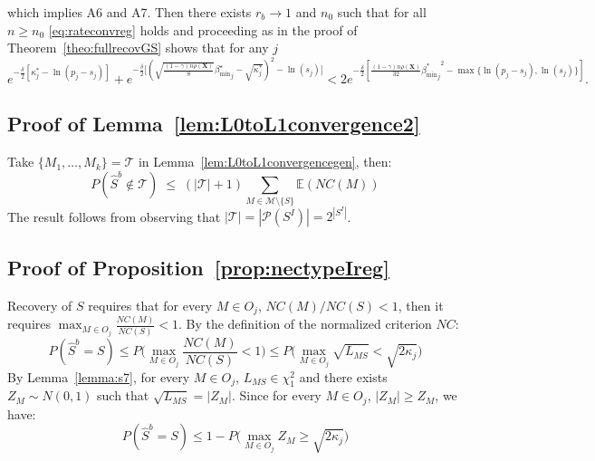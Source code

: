 \documentclass[aos]{imsart}
\theoremstyle{plain}
\newcommand{\E}{\mathbb{E}}
\newcommand{\bs}{\boldsymbol}
\begin{document}
\begin{supplement}
    which implies A6 and A7. Then there exists $r_b\to 1$ and $n_0$ such that for all $n\geq n_0$ \eqref{eq:rateconvreg} holds and proceeding as in the proof of Theorem~\ref{theo:fullrecovGS} shows that for any $j$ 
    $$e^{-\frac{\delta}{2}\left[{\kappa^*_j}-\ln(p_j-s_j)\right]}+e^{-\frac{\delta}{2}\big[(\sqrt{\frac{(1-\gamma) n\rho(\bs X)}{8}}{{\beta_{\min}^{\star}}_j} - \sqrt{\kappa_j^*})^2 -\ln(s_j) \big]} <2 e^{-\frac{\delta}{2}[\frac{(1-\gamma) n\rho(\bs X)}{32}{{\beta_{\min}^*}_j}^2-\max\{\ln(p_j-s_j),\ln(s_j)\}]}. $$

\subsection{Proof of Lemma~\ref{lem:L0toL1convergence2}} Take $\{M_1,\ldots,M_k\}=\mathcal{T}$ in Lemma~\ref{lem:L0toL1convergencegen}, then:
$$
P(\hat{S}^b\not\in \mathcal{T})\;\leq\; (|\mathcal{T}|+1) \sum_{M \in \mathcal{M}\setminus \{S\}}\E\left( NC(M)\right)$$
The result follows from observing that $|\mathcal{T}|=|\mathcal{P}(S^I)|=2^{|S^I|}$.


\subsection{Proof of Proposition~\ref{prop:nectypeIreg}}

Recovery of $S$ requires that for every $M\in O_j$, $NC(M)/NC(S)<1$, then it requires $\max_{M\in O_j}\frac{NC(M)}{NC(S)}<1$. By the definition of the normalized criterion $NC$:
$$P(\hat{S}^b=S) \leq P\Big(\max_{M\in O_j}\frac{NC(M)}{NC(S)}<1\Big)\leq  P\big(\max_{M\in O_j}\sqrt{L_{MS}}<\sqrt{2\kappa_j}\Big)$$
By Lemma~\ref{lemma:s7}, for every $M\in O_j$, $L_{MS}\in \chi^2_1$ and there exists $Z_M\sim N(0,1)$ such that $\sqrt{L_{MS}}=|Z_M|$. Since for every $M\in O_j$, $|Z_M|\geq Z_M$, we have:
\begin{equation}\label{eq:upperboundrecov}
    P(\hat{S}^b=S) \leq  1-P\big(\max_{M\in O_j}Z_M\geq\sqrt{2\kappa_j}\Big)
\end{equation}


\end{supplement}
\end{document}
